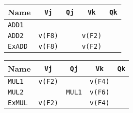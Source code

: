 \begin{enumerate}
    \begin{minipage}[t]{0.43\textwidth}
        \centering
        \begin{adjustbox}{width={\textwidth},totalheight={\textheight},keepaspectratio}
            \begin{tabular}{@{} l | c c c c @{}}
                \toprule
                Name            & \texttt{Vj}           & \texttt{Qj}                       & \texttt{Vk}           & \texttt{Qk}           \\
                \midrule
                \texttt{ADD1}   &                       &                                   &                       &                       \\ [.3em]
                \texttt{ADD2}   & \texttt{v(F8)}        &                                   & \texttt{v(F2)}        &                       \\
                \cmidrule{1-5}
                \texttt{ExADD}  & \texttt{v(F8)}        &                                   & \texttt{v(F2)}        &                       \\
                \bottomrule
            \end{tabular}
        \end{adjustbox}
    \end{minipage}
    \hfill
    \begin{minipage}[t]{0.43\textwidth}
        \centering
        \begin{adjustbox}{width={\textwidth},totalheight={\textheight},keepaspectratio}
            \begin{tabular}{@{} l | c c c c @{}}
                \toprule
                Name            & \texttt{Vj}           & \texttt{Qj}           & \texttt{Vk}           & \texttt{Qk}   \\
                \midrule
                \texttt{MUL1}   & \texttt{v(F2)}        &                       & \texttt{v(F4)}        &               \\ [.3em]
                \texttt{MUL2}   &                       & \texttt{MUL1}         & \texttt{v(F6)}        &               \\
                \cmidrule{1-5}
                \texttt{ExMUL}  & \texttt{v(F2)}        &                       & \texttt{v(F4)}        &               \\
                \bottomrule
            \end{tabular}
        \end{adjustbox}
    \end{minipage}


\end{enumerate}
